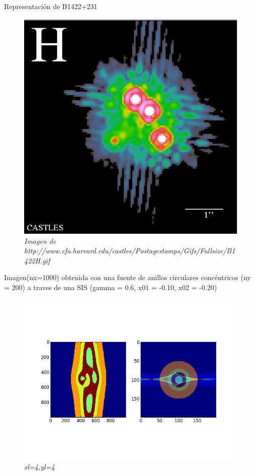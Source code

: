 \documentclass[12pt]{book}
\begin{document}
Representación de B1422+231

\begin{figure}[!h]
 \centering
 \includegraphics[scale=0.4]{B1422H.png}
 \caption{\emph{Imagen de http://www.cfa.harvard.edu/castles/Postagestamps/Gifs/Fullsize/B1422H.gif}}
 \label{Fig: 1}
\end{figure}

Imagen(nx=1000) obtenida con una fuente de anillos circulares concéntricos (ny = 200) a traves de una SIS (gamma = 0.6, x01 = -0.10, x02 = -0.20)

\begin{figure}[!h]
 \centering
 \includegraphics[scale=0.4]{b1422h-iso.png}
 \caption{\emph{xl=4,yl=4}}
 \label{Fig: 1}
\end{figure}
\end{document}
